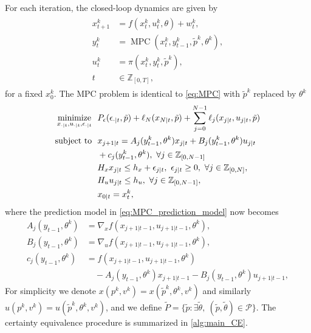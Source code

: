 \documentclass[journal,twoside,web,final]{ieeecolor}
\theoremstyle{definition}
\newcommand{\Z}{\mathbb{Z}}
\begin{document}
For each iteration, the closed-loop dynamics are given by
\begin{align}
\begin{split}
x_{t+1}^k&=f(x_t^k,u_t^k,\theta) + w_t^k,\\
y_t^k&=\operatorname{MPC}(x_t^k,y_{t-1}^k,\tilde{p}^k,\theta^k),\\
u_t^k&=\pi(x_t^k,y_t^k,\tilde{p}^k),\\
t&\in\Z_{[0,T]},
\end{split}\label{eq:system_CE}
\end{align}
for a fixed $x_0^k$. The MPC problem is identical to \cref{eq:MPC} with $\tilde{p}^k$ replaced by $\theta^k$
\begin{align*}
\operatorname*{minimize}_{x_{\cdot|t},u_{\cdot|t},\epsilon_{\cdot|t}} & ~~  P_\epsilon(\epsilon_{\cdot|t},\tilde{p}) + \ell_N(x_{N|t},\tilde{p}) + \sum_{j=0}^{N-1} \ell_j(x_{j|t},u_{j|t},\tilde{p}) \notag \\
\text{subject to} & ~~ x_{j+1|t}=A_j(y_{t-1}^k,\theta^k) x_{j|t} + B_j(y_{t-1}^k,\theta^k) u_{j|t} \notag \\ & ~~ + c_j(y_{t-1}^k,\theta^k),~ \forall j \in \Z_{[0,N-1]} \notag \\ 
& ~~ H_x x_{j|t} \leq h_x + \epsilon_{j|t} ,~\epsilon_{j|t} \geq 0,~ \forall j\in\Z_{[0,N]}, \notag \\
& ~~ H_u u_{j|t} \leq h_u,~ \forall j\in\Z_{[0,N-1]}, \notag \\
& ~~ x_{0|t} = x_t^k,
\end{align*}
%
where the prediction model in \cref{eq:MPC_prediction_model} now becomes
\begin{align*}
A_j(y_{t-1},\theta^k) & = \nabla_x f(x_{j+1|t-1},u_{j+1|t-1},\theta^k),\\
B_j(y_{t-1},\theta^k) & = \nabla_u f(x_{j+1|t-1},u_{j+1|t-1},\theta^k),\\
c_j(y_{t-1},\theta^k) & = f(x_{j+1|t-1},u_{j+1|t-1},\theta^k) \\ & \quad - A_j(y_{t-1},\theta^k)x_{j+1|t-1} - B_j(y_{t-1},\theta^k)u_{j+1|t-1} ,
\end{align*}
For simplicity we denote $x(p^k,v^k)=x(\tilde{p}^k,\theta^k,v^k)$ and similarly $u(p^k,v^k)=u(\tilde{p}^k,\theta^k,v^k)$, 
and we define $\tilde{P}=\{ \tilde{p} : \exists \tilde{\theta} , ~ (\tilde{p},\tilde{\theta}) \in \mathcal{P} \}$.
The certainty equivalence procedure is summarized in \cref{alg:main_CE}.
\end{document}
